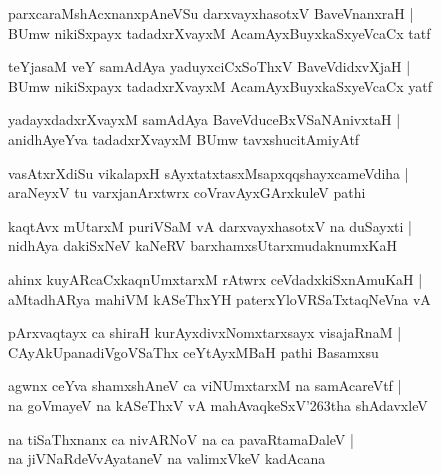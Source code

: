 \documentclass[twoside,12pt,openright]{book}
\def\S{\char'263}
\newcounter{shloka}[chapter]
\begin{document}
\begin{shloka}
parxcaraMshAcxnanxpAneVSu darxvayxhasotxV BaveVnanxraH |\\
BUmw nikiSxpayx tadadxrXvayxM AcamAyxBuyxkaSxyeVcaCx tatf
\end{shloka}

\begin{shloka}
teYjasaM veY samAdAya yaduyxciCxSoThxV BaveVdidxvXjaH |\\
BUmw nikiSxpayx tadadxrXvayxM AcamAyxBuyxkaSxyeVcaCx yatf 
\end{shloka}

\begin{shloka}
yadayxdadxrXvayxM  samAdAya BaveVduceBxVSaNAnivxtaH |\\
anidhAyeYva tadadxrXvayxM BUmw tavxshucitAmiyAtf
\end{shloka}

\begin{shloka}
vasAtxrXdiSu vikalapxH sAyxtatxtasxMsapxqqshayxcameVdiha |\\
araNeyxV tu varxjanArxtwrx coVravAyxGArxkuleV pathi 
\end{shloka}

\begin{shloka}
kaqtAvx mUtarxM puriVSaM vA darxvayxhasotxV na duSayxti |\\
nidhAya dakiSxNeV kaNeRV barxhamxsUtarxmudaknumxKaH 
\end{shloka}

\begin{shloka}
ahinx kuyARcaCxkaqnUmxtarxM rAtwrx ceVdadxkiSxnAmuKaH |\\
aMtadhARya mahiVM kASeThxYH paterxYloVRSaTxtaqNeVna vA
\end{shloka}

\begin{shloka}
pArxvaqtayx ca shiraH kurAyxdivxNomxtarxsayx visajaRnaM |\\
CAyAkUpanadiVgoVSaThx ceYtAyxMBaH pathi Basamxsu 
\end{shloka}

\begin{shloka}
agwnx ceYva shamxshAneV ca viNUmxtarxM na samAcareVtf |\\
na goVmayeV na kASeThxV vA mahAvaqkeSxV\S tha shAdavxleV 
\end{shloka}

\begin{shloka}
na tiSaThxnanx ca nivARNoV na ca pavaRtamaDaleV |\\
na jiVNaRdeVvAyataneV na valimxVkeV kadAcana 
\end{shloka}
\end{document}
